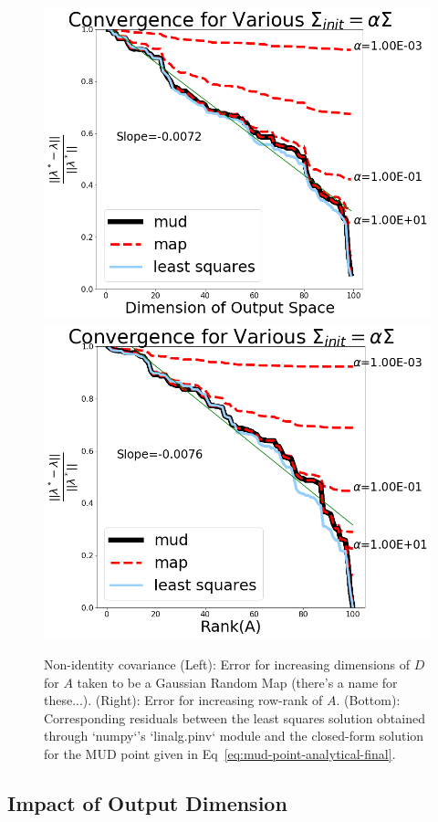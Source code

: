 \begin{figure}[htbp]
  \includegraphics[width=0.475\linewidth]{figures/lin/lin-dim-cov-convergence}
  \includegraphics[width=0.475\linewidth]{figures/lin/lin-rank-cov-convergence}
\caption{
  Non-identity covariance
  (Left): Error for increasing dimensions of $D$ for $A$ taken to be a Gaussian Random Map (there's a name for these...).
  (Right): Error for increasing row-rank of $A$.
  (Bottom): Corresponding residuals between the least squares solution obtained through `numpy`'s `linalg.pinv` module and the closed-form solution for the MUD point given in Eq~\eqref{eq:mud-point-analytical-final}.
}
\label{fig:lin-error}
\end{figure}


\subsection{Impact of Output Dimension}%



